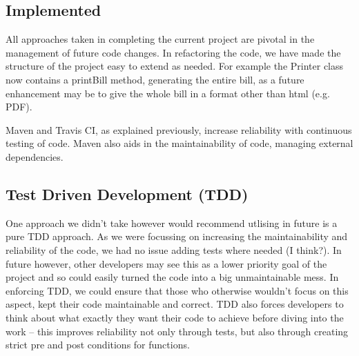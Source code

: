\documentclass[a4paper]{article}
\begin{document}
\subsection{Implemented}

All approaches taken in completing the current project are pivotal in the management
of future code changes. In refactoring the code, we have made the structure of
the project easy to extend as needed. For example the Printer class now contains
a printBill method, generating the entire bill, as a future enhancement may be to
give the whole bill in a format other than html (e.g. PDF).

Maven and Travis CI, as explained previously, increase reliability with continuous
testing of code. Maven also aids in the maintainability of code, managing external
dependencies.

\subsection{Test Driven Development (TDD)}

One approach we didn't take however would recommend utlising in future is a pure
TDD approach. As we were focussing on increasing the maintainability and reliability
of the code, we had no issue adding tests where needed (I think?). In future however,
other developers may see this as a lower priority goal of the project and so could
easily turned the code into a big unmaintainable mess. In enforcing TDD, we could
ensure that those who otherwise wouldn't focus on this aspect, kept their code
maintainable and correct. TDD also forces developers to think about what exactly
they want their code to achieve before diving into the work -- this improves
reliability not only through tests, but also through creating strict pre and
post conditions for functions. 
\end{document}
